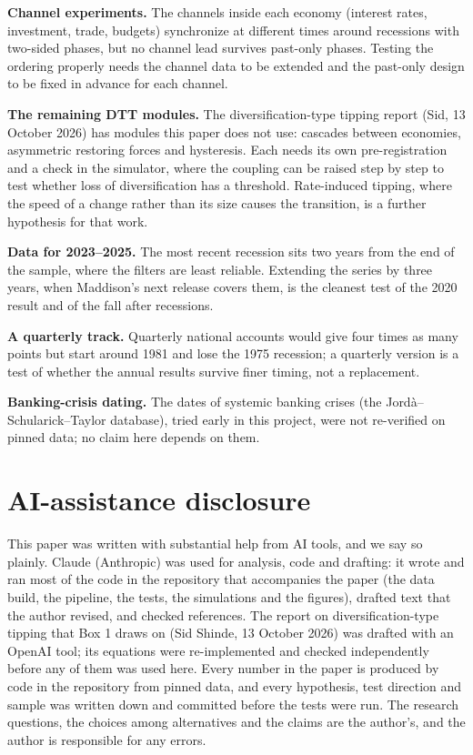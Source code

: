 \documentclass[11pt,a4paper]{article}
\begin{document}
\textbf{Channel experiments.} The channels inside each economy (interest rates, investment, trade, budgets) synchronize at different times around recessions with two-sided phases, but no channel lead survives past-only phases. Testing the ordering properly needs the channel data to be extended and the past-only design to be fixed in advance for each channel.

\textbf{The remaining DTT modules.} The diversification-type tipping report (Sid, 13 October 2026) has modules this paper does not use: cascades between economies, asymmetric restoring forces and hysteresis. Each needs its own pre-registration and a check in the simulator, where the coupling can be raised step by step to test whether loss of diversification has a threshold. Rate-induced tipping, where the speed of a change rather than its size causes the transition, is a further hypothesis for that work.

\textbf{Data for 2023–2025.} The most recent recession sits two years from the end of the sample, where the filters are least reliable. Extending the series by three years, when Maddison's next release covers them, is the cleanest test of the 2020 result and of the fall after recessions.

\textbf{A quarterly track.} Quarterly national accounts would give four times as many points but start around 1981 and lose the 1975 recession; a quarterly version is a test of whether the annual results survive finer timing, not a replacement.

\textbf{Banking-crisis dating.} The dates of systemic banking crises (the Jordà–Schularick–Taylor database), tried early in this project, were not re-verified on pinned data; no claim here depends on them.

\section{AI-assistance disclosure}\label{ai-assistance-disclosure}

This paper was written with substantial help from AI tools, and we say so plainly. Claude (Anthropic) was used for analysis, code and drafting: it wrote and ran most of the code in the repository that accompanies the paper (the data build, the pipeline, the tests, the simulations and the figures), drafted text that the author revised, and checked references. The report on diversification-type tipping that Box 1 draws on (Sid Shinde, 13 October 2026) was drafted with an OpenAI tool; its equations were re-implemented and checked independently before any of them was used here. Every number in the paper is produced by code in the repository from pinned data, and every hypothesis, test direction and sample was written down and committed before the tests were run. The research questions, the choices among alternatives and the claims are the author's, and the author is responsible for any errors.
\end{document}
